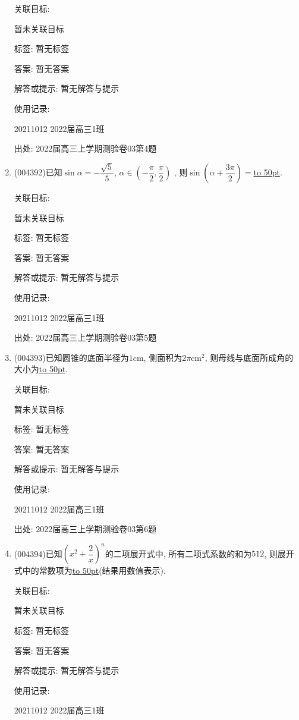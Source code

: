 \documentclass[10pt,a4paper]{article}
\newcommand{\blank}[1]{\underline{\hbox to #1pt{}}}
\begin{document}
\begin{enumerate}[1.]
关联目标:

暂未关联目标



标签: 暂无标签

答案: 暂无答案

解答或提示: 暂无解答与提示

使用记录:

20211012	2022届高三1班	


出处: 2022届高三上学期测验卷03第4题
\item { (004392)}已知$\sin \alpha =-\dfrac{\sqrt 5}5$, $\alpha \in (-\dfrac{\pi}2,\dfrac{\pi}2)$ , 则$\sin (\alpha +\dfrac{3\pi}2)=$\blank{50}.


关联目标:

暂未关联目标



标签: 暂无标签

答案: 暂无答案

解答或提示: 暂无解答与提示

使用记录:

20211012	2022届高三1班	


出处: 2022届高三上学期测验卷03第5题
\item { (004393)}已知圆锥的底面半径为$1\text{cm}$, 侧面积为$2\pi\text{cm}^2$, 则母线与底面所成角的大小为\blank{50}.


关联目标:

暂未关联目标



标签: 暂无标签

答案: 暂无答案

解答或提示: 暂无解答与提示

使用记录:

20211012	2022届高三1班	


出处: 2022届高三上学期测验卷03第6题
\item { (004394)}已知$(x^2+\dfrac 2x)^n$的二项展开式中, 所有二项式系数的和为$512$, 则展开式中的常数项为\blank{50}(结果用数值表示).


关联目标:

暂未关联目标



标签: 暂无标签

答案: 暂无答案

解答或提示: 暂无解答与提示

使用记录:

20211012	2022届高三1班	



\end{enumerate}
\end{document}
